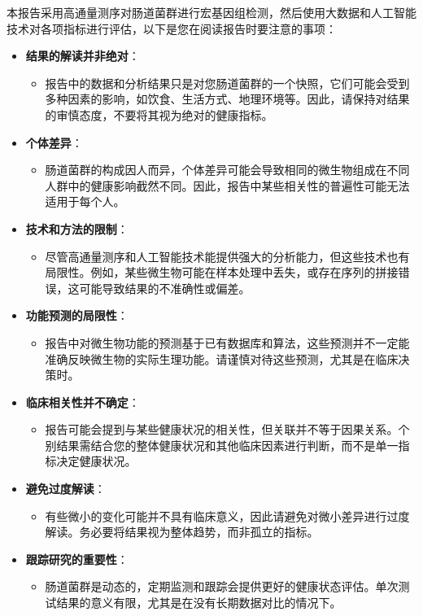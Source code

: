 \documentclass[UTF8]{ctexart}
\begin{document}
\begin{tcolorbox}[
    enhanced,
    colback=lightpurple!10, %
    colframe=white,  %
    arc=3mm,
    boxrule=0.5pt,
    width=\textwidth,
    top=8pt,
    bottom=8pt
]
{\small{\color{orange}\faExclamationTriangle}
本报告采用高通量测序对肠道菌群进行宏基因组检测，然后使用大数据和人工智能技术对各项指标进行评估，以下是您在阅读报告时要注意的事项：
\begin{itemize}

    \item \textbf{结果的解读并非绝对}：
    \begin{itemize}
        \item 报告中的数据和分析结果只是对您肠道菌群的一个快照，它们可能会受到多种因素的影响，如饮食、生活方式、地理环境等。因此，请保持对结果的审慎态度，不要将其视为绝对的健康指标。
    \end{itemize}
    \item \textbf{个体差异}：
    \begin{itemize}
        \item 肠道菌群的构成因人而异，个体差异可能会导致相同的微生物组成在不同人群中的健康影响截然不同。因此，报告中某些相关性的普遍性可能无法适用于每个人。
    \end{itemize}
    \item \textbf{技术和方法的限制}：
    \begin{itemize}
        \item 尽管高通量测序和人工智能技术能提供强大的分析能力，但这些技术也有局限性。例如，某些微生物可能在样本处理中丢失，或存在序列的拼接错误，这可能导致结果的不准确性或偏差。
    \end{itemize}
    \item \textbf{功能预测的局限性}：
    \begin{itemize}
        \item 报告中对微生物功能的预测基于已有数据库和算法，这些预测并不一定能准确反映微生物的实际生理功能。请谨慎对待这些预测，尤其是在临床决策时。
    \end{itemize}
    \item \textbf{临床相关性并不确定}：
    \begin{itemize}
        \item 报告可能会提到与某些健康状况的相关性，但关联并不等于因果关系。个别结果需结合您的整体健康状况和其他临床因素进行判断，而不是单一指标决定健康状况。
    \end{itemize}
    \item \textbf{避免过度解读}：
    \begin{itemize}
        \item 有些微小的变化可能并不具有临床意义，因此请避免对微小差异进行过度解读。务必要将结果视为整体趋势，而非孤立的指标。
    \end{itemize}
    \item \textbf{跟踪研究的重要性}：
    \begin{itemize}
        \item 肠道菌群是动态的，定期监测和跟踪会提供更好的健康状态评估。单次测试结果的意义有限，尤其是在没有长期数据对比的情况下。
    \end{itemize}
\end{itemize}
}
\end{tcolorbox}
\end{document}
